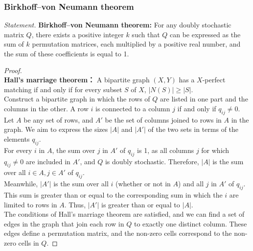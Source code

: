 \documentclass[a4paper,12pt]{report}
\begin{document}
\subsubsection{Birkhoff–von Neumann theorem}
\textit{Statement. }\textbf{Birkhoff–von Neumann theorem:} For any doubly stochastic matrix \(Q\), there exists a positive integer \(k\) such that \(Q\) can be expressed as the sum of \(k\) permutation matrices, each multiplied by a positive real number, and the sum of these coefficients is equal to 1.
\begin{proof}\mbox{}\\
\textbf{Hall's marriage theorem：} A bipartite graph \((X, Y)\) has a \(X\)-perfect matching if and only if for every subset \(S\) of \(X\), \(|N(S)| \geq |S|\). \\
Construct a bipartite graph in which the rows of \(Q\) are listed in one part and the columns in the other. A row \(i\) is connected to a column \(j\) if and only if \(q_{ij} \neq 0\). Let \(A\) be any set of rows, and \(A'\) be the set of columns joined to rows in \(A\) in the graph. We aim to express the sizes \(|A|\) and \(|A'|\) of the two sets in terms of the elements \(q_{ij}\). \\
For every \(i\) in \(A\), the sum over \(j\) in \(A'\) of \(q_{ij}\) is 1, as all columns \(j\) for which \(q_{ij} \neq 0\) are included in \(A'\), and \(Q\) is doubly stochastic. Therefore, \(|A|\) is the sum over all \(i \in A, j \in A'\) of \(q_{ij}\). \\
Meanwhile, \(|A'|\) is the sum over all \(i\) (whether or not in \(A\)) and all \(j\) in \(A'\) of \(q_{ij}\). This sum is greater than or equal to the corresponding sum in which the \(i\) are limited to rows in \(A\). Thus, \(|A'|\) is greater than or equal to \(|A|\). \\
The conditions of Hall's marriage theorem are satisfied, and we can find a set of edges in the graph that join each row in \(Q\) to exactly one distinct column. These edges define a permutation matrix, and the non-zero cells correspond to the non-zero cells in \(Q\).
\end{proof}
\end{document}
